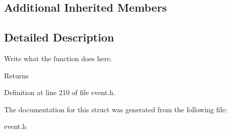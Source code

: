 \subsection*{Additional Inherited Members}


\subsection{Detailed Description}
Write what the function does here. 

\begin{DoxyReturn}{Returns}

\end{DoxyReturn}


Definition at line 210 of file event.\+h.



The documentation for this struct was generated from the following file\+:\begin{DoxyCompactItemize}
\item 
event.\+h\end{DoxyCompactItemize}
